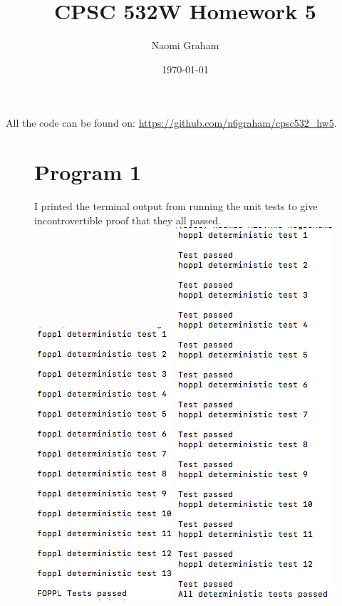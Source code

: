 \documentclass[12pt]{article}%
\theoremstyle{definition}
\begin{document}
	
	\title{CPSC 532W Homework 5}
	\author{Naomi Graham}
	\date{\today}
	\maketitle
	
	All the code can be found on: \url{https://github.com/n6graham/cpsc532_hw5}.
	


	
	\begin{figure}[h]
	\section{Program 1}
	I printed the terminal output from running the unit tests to give incontrovertible proof that they all passed.
	\newline
		\includegraphics[scale=0.6]{foppl}
		\includegraphics[scale=0.6]{hoppl}

\end{figure}
\end{document}
